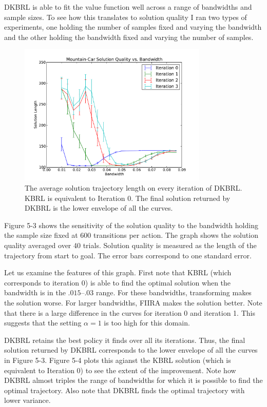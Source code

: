 DKBRL is able to fit the value function well across a range of
bandwidths and sample sizes.
To see how this translates to solution quality I ran two types of experiments,
one holding the number of samples fixed and varying the bandwidth and
the other holding the bandwidth fixed and varying the number of samples.

\begin{figure}[!!!ht]
  \centering
    \includegraphics[width=90mm]{figs/chap5/mcband.pdf}
  \caption[Mountain-Car bandwidth sensitivity on each iteration of DKBRL]
{The average solution trajectory length on every iteration of
DKBRL. KBRL is equivalent to Iteration 0. The final solution returned by
DKBRL is the lower envelope of all the curves.}
\end{figure}

Figure 5-3 shows the sensitivity of the solution quality to the bandwidth
holding the sample size fixed at 600 transitions per action.
The graph shows the solution quality averaged over 40 trials.
Solution quality is measured as the length of the trajectory from start to
goal.
The error bars correspond to  one standard error.

Let us examine the features of this graph.
First note that KBRL (which corresponds to iteration 0)
is able to find the optimal solution when the bandwidth is in the
$.015$--$.03$ range. 
For these bandwidths, transforming makes the solution worse.
For larger bandwidths, FIIRA makes the solution better.
Note that there is a large difference in the curves for iteration 0 and
iteration 1.
This suggests that the setting $\alpha = 1$ is too high for this domain.

DKBRL retains the best policy it finds over all its iterations.
Thus, the final solution returned by DKBRL corresponds to the lower envelope of all
the curves in Figure 5-3.
Figure 5-4 plots this agianst the KBRL solution (which is equivalent to
Iteration 0) to see the extent of the improvement.
Note how DKBRL almost triples the range of bandwidths for which it is possible
to find the optimal trajectory.
Also note that DKBRL finds the optimal trajectory with lower
variance.

